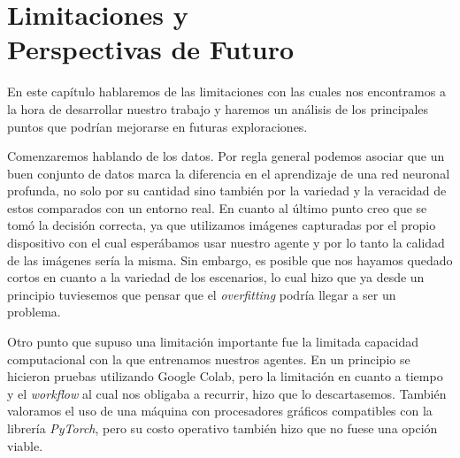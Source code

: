 
\cleardoublepage

\chapter{Limitaciones y\\ Perspectivas de Futuro}
\label{limitaciones-y-futuro}

En este capítulo hablaremos de las limitaciones con las cuales nos encontramos a la hora de desarrollar nuestro trabajo y haremos un análisis de los principales puntos que podrían mejorarse en futuras exploraciones.
\medskip

Comenzaremos hablando de los datos. Por regla general podemos asociar que un buen conjunto de datos marca la diferencia en el aprendizaje de una red neuronal profunda, no solo por su cantidad sino también por la variedad y la veracidad de estos comparados con un entorno real. En cuanto al último punto creo que se tomó la decisión correcta, ya que utilizamos imágenes capturadas por el propio dispositivo con el cual esperábamos usar nuestro agente y por lo tanto la calidad de las imágenes sería la misma. Sin embargo, es posible que nos hayamos quedado cortos en cuanto a la variedad de los escenarios, lo cual hizo que ya desde un principio tuviesemos que pensar que el \textit{overfitting} podría llegar a ser un problema.
\medskip

Otro punto que supuso una limitación importante fue la limitada capacidad computacional con la que entrenamos nuestros agentes. En un principio se hicieron pruebas utilizando Google Colab, pero la limitación en cuanto a tiempo y el \textit{workflow} al cual nos obligaba a recurrir, hizo que lo descartasemos. También valoramos el uso de una máquina con procesadores gráficos compatibles con la librería \textit{PyTorch}, pero su costo operativo también hizo que no fuese una opción viable.
\medskip